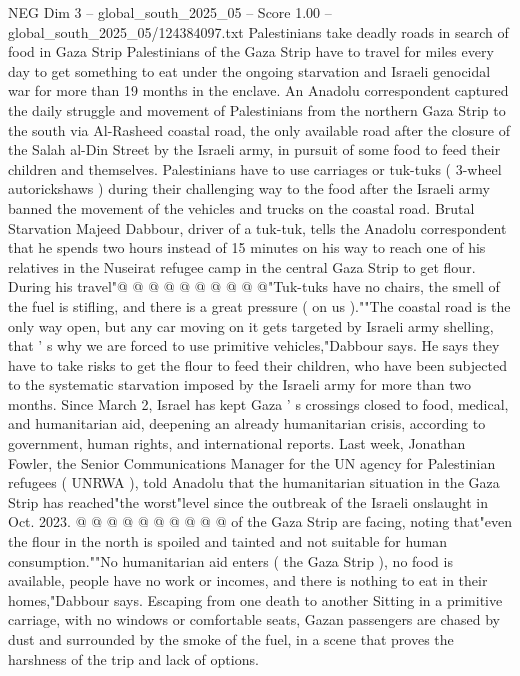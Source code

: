 \begin{textsample}{NEG Dim 3 – global\_south\_2025\_05 – Score 1.00 – global\_south\_2025\_05/124384097.txt}  \label{ex:f3_neg_229}
Palestinians take deadly roads in search of food in Gaza Strip Palestinians of the Gaza Strip have to travel for miles every day to get something to eat under the ongoing starvation and Israeli genocidal war for more than 19 months in the enclave.
An Anadolu correspondent captured the daily struggle and movement of Palestinians from the northern Gaza Strip to the south via Al-Rasheed coastal road, the only available road after the closure of the Salah al-Din Street by the Israeli army, in pursuit of some food to feed their children and themselves.
Palestinians have to use carriages or tuk-tuks ( 3-wheel autorickshaws ) during their challenging way to the food after the Israeli army banned the movement of the vehicles and trucks on the coastal road.
Brutal Starvation Majeed Dabbour, driver of a tuk-tuk, tells the Anadolu correspondent that he spends two hours instead of 15 minutes on his way to reach one of his relatives in the Nuseirat refugee camp in the central Gaza Strip to get flour.
During his travel"@ @ @ @ @ @ @ @ @ @"Tuk-tuks have no chairs, the smell of the fuel is stifling, and there is a great pressure ( on us ).""The coastal road is the only way open, but any car moving on it gets targeted by Israeli army shelling, that ' s why we are forced to use primitive vehicles,"Dabbour says.
He says they have to take risks to get the flour to feed their children, who have been subjected to the systematic starvation imposed by the Israeli army for more than two months.
Since March 2, Israel has kept Gaza ' s crossings closed to food, medical, and humanitarian aid, deepening an already humanitarian crisis, according to government, human rights, and international reports.
Last week, Jonathan Fowler, the Senior Communications Manager for the UN agency for Palestinian refugees ( UNRWA ), told Anadolu that the humanitarian situation in the Gaza Strip has reached"the worst"level since the outbreak of the Israeli onslaught in Oct. 2023. @ @ @ @ @ @ @ @ @ @ of the Gaza Strip are facing, noting that"even the flour in the north is spoiled and tainted and not suitable for human consumption.""No humanitarian aid enters ( the Gaza Strip ), no food is available, people have no work or incomes, and there is nothing to eat in their homes,"Dabbour says.
Escaping from one death to another Sitting in a primitive carriage, with no windows or comfortable seats, Gazan passengers are chased by dust and surrounded by the smoke of the fuel, in a scene that proves the harshness of the trip and lack of options.

\end{textsample}

